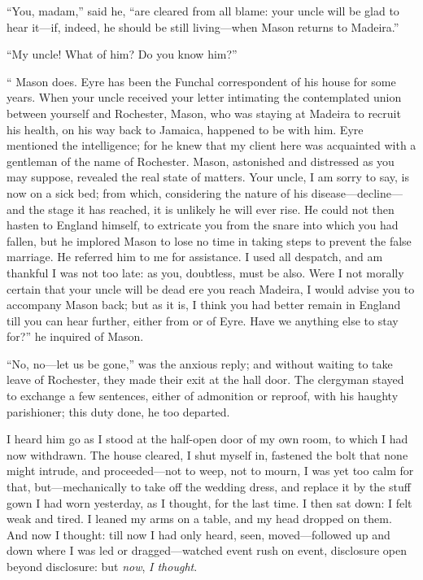 \enquote{You, madam,} said he, \enquote{are cleared from all blame: your
uncle will be glad to hear it---if, indeed, he should be still
living---when \Mr{} Mason returns to Madeira.}

\enquote{My uncle! What of him? Do you know him?}

\enquote{\Mr{} Mason does. \Mr{} Eyre has been the Funchal correspondent of
his house for some years. When your uncle received your letter
intimating the contemplated union between yourself and \Mr{} Rochester,
\Mr{} Mason, who was staying at Madeira to recruit his health, on his way
back to Jamaica, happened to be with him. \Mr{} Eyre mentioned the
intelligence; for he knew that my client here was acquainted with a
gentleman of the name of Rochester. \Mr{} Mason, astonished and
distressed as you may suppose, revealed the real state of matters. Your
uncle, I am sorry to say, is now on a sick bed; from which, considering
the nature of his disease---decline---and the stage it has reached, it
is unlikely he will ever rise. He could not then hasten to England
himself, to extricate you from the snare into which you had fallen, but
he implored \Mr{} Mason to lose no time in taking steps to prevent the
false marriage. He referred him to me for assistance. I used all
despatch, and am thankful I was not too late: as you, doubtless, must be
also. Were I not morally certain that your uncle will be dead ere you
reach Madeira, I would advise you to accompany \Mr{} Mason back; but as it
is, I think you had better remain in England till you can hear further,
either from or of \Mr{} Eyre. Have we anything else to stay for?} he
inquired of \Mr{} Mason.

\enquote{No, no---let us be gone,} was the anxious reply; and without
waiting to take leave of \Mr{} Rochester, they made their exit at the hall
door. The clergyman stayed to exchange a few sentences, either of
admonition or reproof, with his haughty parishioner; this duty done, he
too departed.

I heard him go as I stood at the half-open door of my own room, to which
I had now withdrawn. The house cleared, I shut myself in, fastened the
bolt that none might intrude, and proceeded---not to weep, not to mourn,
I was yet too calm for that, but---mechanically to take off the wedding
dress, and replace it by the stuff gown I had worn yesterday, as I
thought, for the last time. I then sat down: I felt weak and tired. I
leaned my arms on a table, and my head dropped on them. And now I
thought: till now I had only heard, seen, moved---followed up and down
where I was led or dragged---watched event rush on event, disclosure
open beyond disclosure: but \emph{now}, \emph{I thought}.

